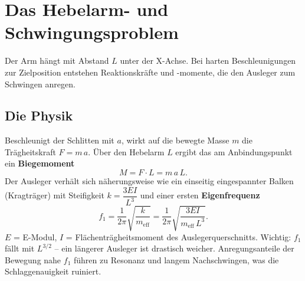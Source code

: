 
\chapter{Das Hebelarm- und Schwingungsproblem}

Der Arm hängt mit Abstand $L$ unter der X-Achse. Bei harten Beschleunigungen
zur Zielposition entstehen Reaktionskräfte und -momente, die den Ausleger zum
Schwingen anregen.

\section{Die Physik}
Beschleunigt der Schlitten mit $a$, wirkt auf die bewegte Masse $m$ die
Trägheitskraft $F=m\,a$. Über den Hebelarm $L$ ergibt das am Anbindungspunkt
ein \textbf{Biegemoment}
\begin{equation}
M = F\cdot L = m\,a\,L.
\end{equation}
Der Ausleger verhält sich näherungsweise wie ein einseitig eingespannter Balken
(Kragträger) mit Steifigkeit $k=\dfrac{3EI}{L^3}$ und einer ersten
\textbf{Eigenfrequenz}
\begin{equation}
f_1 = \frac{1}{2\pi}\sqrt{\frac{k}{m_{\text{eff}}}}
    = \frac{1}{2\pi}\sqrt{\frac{3EI}{m_{\text{eff}}\,L^3}}.
\end{equation}
$E$ = E-Modul, $I$ = Flächenträgheitsmoment des Auslegerquerschnitts.
Wichtig: $f_1$ fällt mit $L^{3/2}$ -- ein längerer Ausleger ist drastisch
weicher. Anregungsanteile der Bewegung nahe $f_1$ führen zu Resonanz und langem
Nachschwingen, was die Schlaggenauigkeit ruiniert.

